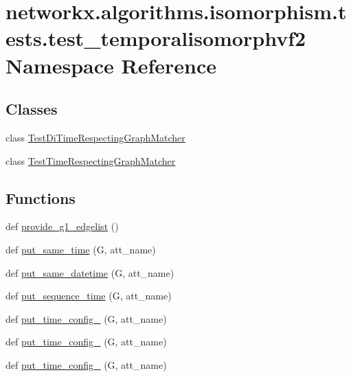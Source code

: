 \hypertarget{namespacenetworkx_1_1algorithms_1_1isomorphism_1_1tests_1_1test__temporalisomorphvf2}{}\section{networkx.\+algorithms.\+isomorphism.\+tests.\+test\+\_\+temporalisomorphvf2 Namespace Reference}
\label{namespacenetworkx_1_1algorithms_1_1isomorphism_1_1tests_1_1test__temporalisomorphvf2}
\subsection*{Classes}
\begin{DoxyCompactItemize}
\item 
class \hyperlink{classnetworkx_1_1algorithms_1_1isomorphism_1_1tests_1_1test__temporalisomorphvf2_1_1TestDiTimeRespectingGraphMatcher}{Test\+Di\+Time\+Respecting\+Graph\+Matcher}
\item 
class \hyperlink{classnetworkx_1_1algorithms_1_1isomorphism_1_1tests_1_1test__temporalisomorphvf2_1_1TestTimeRespectingGraphMatcher}{Test\+Time\+Respecting\+Graph\+Matcher}
\end{DoxyCompactItemize}
\subsection*{Functions}
\begin{DoxyCompactItemize}
\item 
def \hyperlink{namespacenetworkx_1_1algorithms_1_1isomorphism_1_1tests_1_1test__temporalisomorphvf2_a17af51204b2c0809f17ba3acedf70380}{provide\+\_\+g1\+\_\+edgelist} ()
\item 
def \hyperlink{namespacenetworkx_1_1algorithms_1_1isomorphism_1_1tests_1_1test__temporalisomorphvf2_a8632e7140da85a403842e380eef2d30c}{put\+\_\+same\+\_\+time} (G, att\+\_\+name)
\item 
def \hyperlink{namespacenetworkx_1_1algorithms_1_1isomorphism_1_1tests_1_1test__temporalisomorphvf2_a636241a00b71703250a7def4b3319198}{put\+\_\+same\+\_\+datetime} (G, att\+\_\+name)
\item 
def \hyperlink{namespacenetworkx_1_1algorithms_1_1isomorphism_1_1tests_1_1test__temporalisomorphvf2_a98ca193d9e18a3c2eb448c5f1759b402}{put\+\_\+sequence\+\_\+time} (G, att\+\_\+name)
\item 
def \hyperlink{namespacenetworkx_1_1algorithms_1_1isomorphism_1_1tests_1_1test__temporalisomorphvf2_a5b0ad69fcf7afe131378be640f0221a9}{put\+\_\+time\+\_\+config\+\_} (G, att\+\_\+name)
\item 
def \hyperlink{namespacenetworkx_1_1algorithms_1_1isomorphism_1_1tests_1_1test__temporalisomorphvf2_a0088b5cbc7cdcfca9695fadd8b20ed56}{put\+\_\+time\+\_\+config\+\_} (G, att\+\_\+name)
\item 
def \hyperlink{namespacenetworkx_1_1algorithms_1_1isomorphism_1_1tests_1_1test__temporalisomorphvf2_a05bc17ff4f4d9c71085d80c9c7f88568}{put\+\_\+time\+\_\+config\+\_} (G, att\+\_\+name)
\end{DoxyCompactItemize}


